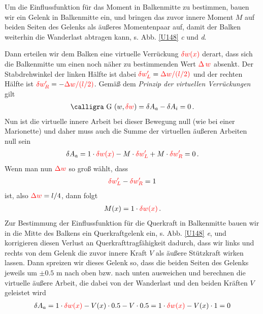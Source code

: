 {{{{Um die Einflussfunktion f\"{u}r das Moment in Balkenmitte zu bestimmen,  bauen wir ein Gelenk in Balkenmitte ein, und bringen das zuvor innere Moment $M$ auf beiden Seiten des Gelenks als \"{a}u{\ss}eres Momentenpaar auf, damit der Balken weiterhin die Wanderlast abtragen kann, s. Abb. \ref{U148} {\em c\/} und {\em d\/}.

Dann erteilen wir dem Balken eine virtuelle Verr\"{u}ckung $\textcolor{red}{\delta w(x)}$ derart, dass sich die Balkenmitte um einen noch n\"{a}her zu bestimmenden Wert  $\textcolor{red}{\Delta\,w}$ absenkt. Der Stabdrehwinkel der linken H\"{a}lfte ist dabei $\textcolor{red}{\delta w_L'} = \textcolor{red}{\Delta w/(l/2)}$ und der rechten H\"{a}lfte ist $\textcolor{red}{\delta w_R'} = -\textcolor{red}{\Delta w/(l/2)}$. Gem\"{a}{\ss} dem {\em Prinzip der virtuellen Verr\"{u}ckungen\/} gilt
\begin{align}
\text{\normalfont\calligra G\,\,}(w, \textcolor{red}{\delta w}) = \delta A_a - \delta A_i = 0\,.
\end{align}
Nun ist die virtuelle innere Arbeit bei dieser Bewegung null (wie bei einer Marionette) und daher  muss auch die Summe der virtuellen \"{a}u{\ss}eren Arbeiten null sein
\begin{align}
\delta A_a = 1 \cdot \textcolor{red}{\delta w(x)} - M\cdot \textcolor{red}{\delta w_L'} + M \cdot \textcolor{red}{\delta w_R'}= 0\,.
\end{align}
Wenn man nun $\textcolor{red}{\Delta w}$ so gro{\ss} w\"{a}hlt, dass
\begin{align}
\textcolor{red}{\delta w_L'} - \textcolor{red}{\delta w_R'} = 1
\end{align}
ist, also $\textcolor{red}{\Delta w} = l/4$, dann folgt
\begin{align}
M(x) = 1 \cdot \textcolor{red}{\delta w(x)}\,.
\end{align}
Zur Bestimmung der Einflussfunktion f\"{u}r die Querkraft in Balkenmitte bauen wir in die Mitte des Balkens ein Querkraftgelenk ein, s. Abb. \ref{U148} {\em e\/}, und korrigieren diesen Verlust an Querkrafttragf\"{a}higkeit dadurch, dass wir links und rechts von dem Gelenk die zuvor innere Kraft $V$ als \"{a}u{\ss}ere St\"{u}tzkraft wirken lassen. Dann spreizen wir dieses Gelenk so, dass die beiden Seiten des Gelenks jeweils um $\pm 0.5$ m nach oben bzw. nach unten ausweichen und berechnen die virtuelle \"{a}u{\ss}ere Arbeit, die dabei von der Wanderlast und den beiden Kr\"{a}ften $V$ geleistet wird
\begin{align}
\delta A_a = 1 \cdot\textcolor{red}{\delta w(x)} - V(x) \cdot 0.5 - V \cdot 0.5 = 1 \cdot \textcolor{red}{\delta w(x)} - V(x) \cdot 1 = 0

\end{align}}}}}
